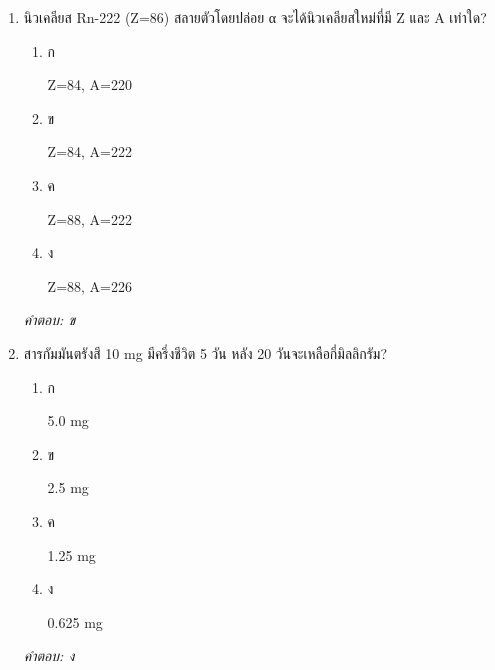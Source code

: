 \documentclass[12pt]{article}
\begin{document}
\begin{enumerate}[label=\arabic*., itemsep=0.5\baselineskip, topsep=0.5\baselineskip, leftmargin=*]
\item นิวเคลียส Rn-222 (Z=86) สลายตัวโดยปล่อย α จะได้นิวเคลียสใหม่ที่มี Z และ A เท่าใด?
\begin{enumerate}[label=\alph*)., itemsep=0.3\baselineskip, topsep=0.3\baselineskip]
\item ก\ 
\begin{minipage}[t]{0.9\linewidth}
\raggedright Z=84, A=220
\end{minipage}
\item ข\ 
\begin{minipage}[t]{0.9\linewidth}
\raggedright Z=84, A=222
\end{minipage}
\item ค\ 
\begin{minipage}[t]{0.9\linewidth}
\raggedright Z=88, A=222
\end{minipage}
\item ง\ 
\begin{minipage}[t]{0.9\linewidth}
\raggedright Z=88, A=226
\end{minipage}
\end{enumerate}
\vspace{-0.3\baselineskip}
\begin{small}
\textit{คำตอบ: ข}
\end{small}

\item สารกัมมันตรังสี 10 mg มีครึ่งชีวิต 5 วัน หลัง 20 วันจะเหลือกี่มิลลิกรัม?
\begin{enumerate}[label=\alph*)., itemsep=0.3\baselineskip, topsep=0.3\baselineskip]
\item ก\ 
\begin{minipage}[t]{0.9\linewidth}
\raggedright 5.0 mg
\end{minipage}
\item ข\ 
\begin{minipage}[t]{0.9\linewidth}
\raggedright 2.5 mg
\end{minipage}
\item ค\ 
\begin{minipage}[t]{0.9\linewidth}
\raggedright 1.25 mg
\end{minipage}
\item ง\ 
\begin{minipage}[t]{0.9\linewidth}
\raggedright 0.625 mg
\end{minipage}
\end{enumerate}
\vspace{-0.3\baselineskip}
\begin{small}
\textit{คำตอบ: ง}
\end{small}


\end{enumerate}
\end{document}
